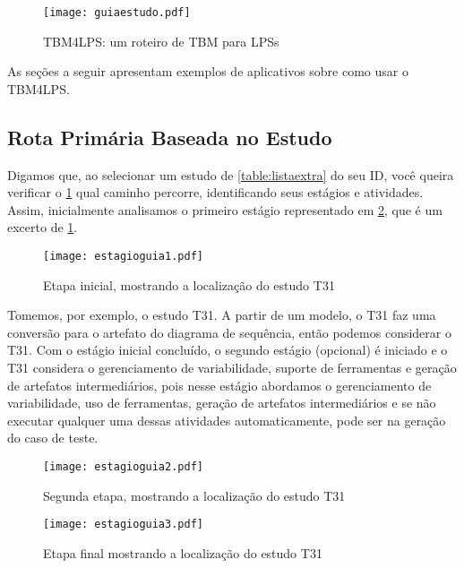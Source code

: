 \begin{tiny}
	\begin{landscape}	
		\begin{figure}[!h]
			\centering
			\texttt{[image: guiaestudo.pdf]}
			\caption{TBM4LPS: um roteiro de TBM para LPSs}
			\label{fig:guiaestudo}
		\end{figure}	
	\end{landscape}
\end{tiny}

As seções a seguir apresentam exemplos de aplicativos sobre como usar o TBM4LPS.

\subsection{Rota Primária Baseada no Estudo}

Digamos que, ao selecionar um estudo de \ref{table:listaextra} do seu ID, você queira verificar o \ref{fig:guiaestudo} qual caminho percorre, identificando seus estágios e atividades. Assim, inicialmente analisamos o primeiro estágio representado em \ref{fig:estagio1}, que é um excerto de \ref{fig:guiaestudo}.

\begin{figure}[!h]
	\centering
	\texttt{[image: estagioguia1.pdf]}
	\caption{Etapa inicial, mostrando a localização do estudo T31}
	\label{fig:estagio1}
\end{figure}

Tomemos, por exemplo, o estudo T31. A partir de um modelo, o T31 faz uma conversão para o artefato do diagrama de sequência, então podemos considerar o T31. Com o estágio inicial concluído, o segundo estágio (opcional) é iniciado e o T31 considera o gerenciamento de variabilidade, suporte de ferramentas e geração de artefatos intermediários, pois nesse estágio abordamos o gerenciamento de variabilidade, uso de ferramentas, geração de artefatos intermediários e se não executar qualquer uma dessas atividades automaticamente, pode ser na geração do caso de teste.

\begin{figure}[!h]
	\centering
	\texttt{[image: estagioguia2.pdf]}
	\caption{Segunda etapa, mostrando a localização do estudo T31}
	\label{fig:estagio2}
\end{figure}

\begin{figure}[!h]
	\centering
	\texttt{[image: estagioguia3.pdf]}
	\caption{Etapa final mostrando a localização do estudo T31}
	\label{fig:estagio3}
\end{figure}

